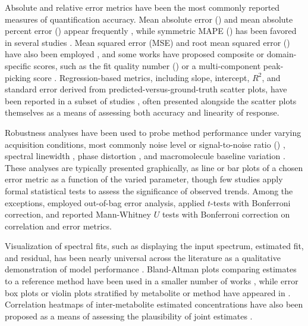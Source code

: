 Absolute and relative error metrics have been the most commonly reported measures of quantification accuracy. Mean absolute error (\MAE) and mean absolute percent error (\MAPE) appear frequently \cite{Chandler2019, Lee2019b, Lee2020, Long2024, Wu2024}, while symmetric MAPE (\SMAPE) has been favored in several studies \cite{Hatami2018, Shamaei2020, Shamaei2021}. Mean squared error (MSE) and root mean squared error (\RMSE) have also been employed \cite{Das2017, Hiltunen2002, Rizzo2023}, and some works have proposed composite or domain-specific scores, such as the fit quality number (\FQN) \cite{Near2021} \cite{Jeong2024, Wu2024} or a multi-component peak-picking score \cite{Schmid2023}. Regression-based metrics, including slope, intercept, $R^2$, and standard error derived from predicted-versus-ground-truth scatter plots, have been reported in a subset of studies \cite{Chandler2019, Iqbal2021, Rizzo2022, Rizzo2023}, often presented alongside the scatter plots themselves as a means of assessing both accuracy and linearity of response.

Robustness analyses have been used to probe method performance under varying acquisition conditions, most commonly noise level or signal-to-noise ratio (\SNR) \cite{Bhat2006, Hatami2018, Shamaei2021, Lee2022, Long2024}, spectral linewidth \cite{Lee2022, Long2024}, phase distortion \cite{Bhat2006, Shamaei2021}, and macromolecule baseline variation \cite{Hatami2018, Shamaei2021}. These analyses are typically presented graphically, as line or bar plots of a chosen error metric as a function of the varied parameter, though few studies apply formal statistical tests to assess the significance of observed trends. Among the exceptions, \cite{Das2017} employed out-of-bag error analysis, \cite{Songeon2023} applied $t$-tests with Bonferroni correction, and \cite{Jeong2024} reported Mann-Whitney $U$ tests with Bonferroni correction on correlation and error metrics.

Visualization of spectral fits, such as displaying the input spectrum, estimated fit, and residual, has been nearly universal across the literature as a qualitative demonstration of model performance \cite{Gurbani2019, Lee2019b, Shamaei2023, Zhang2023, Wu2024}. Bland-Altman plots comparing \DL estimates to a reference method have been used in a smaller number of works \cite{Bhat2006, Songeon2023, Shamaei2025}, while error box plots or violin plots stratified by metabolite or method have appeared in \cite{Das2017, Jeong2024}. Correlation heatmaps of inter-metabolite estimated concentrations have also been proposed as a means of assessing the plausibility of joint estimates \cite{Shamaei2023}.

